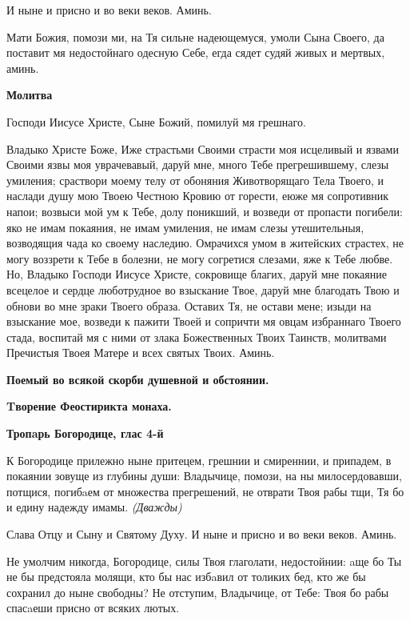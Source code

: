 И ныне и присно и во веки веков. Аминь.


Мати Божия, помози ми, на Тя сильне надеющемуся, умоли Сына Своего, да поставит мя недостойнаго одесную Себе, егда сядет судяй живых и мертвых, аминь.




\bfseries Молитва\normalfont{}


Господи Иисусе Христе, Сыне Божий, помилуй мя грешнаго.


Владыко Христе Боже, Иже страстьми Своими страсти моя исцеливый и язвами Своими язвы моя уврачевавый, даруй мне, много Тебе прегрешившему, слезы умиления; сраствори моему телу от обоняния Животворящаго Тела Твоего, и наслади душу мою Твоею Честною Кровию от горести, еюже мя сопротивник напои; возвыси мой ум к Тебе, долу поникший, и возведи от пропасти погибели: яко не имам покаяния, не имам умиления, не имам слезы утешительныя, возводящия чада ко своему наследию. Омрачихся умом в житейских страстех, не могу воззрети к Тебе в болезни, не могу согретися слезами, яже к Тебе любве. Но, Владыко Господи Иисусе Христе, сокровище благих, даруй мне покаяние всецелое и сердце люботрудное во взыскание Твое, даруй мне благодать Твою и обнови во мне зраки Твоего образа. Оставих Тя, не остави мене; изыди на взыскание мое, возведи к пажити Твоей и сопричти мя овцам избраннаго Твоего стада, воспитай мя с ними от злака Божественных Твоих Таинств, молитвами Пречистыя Твоея Матере и всех святых Твоих. Аминь.


\mychapterending





\bfseries Поемый во всякой скорби душевной и обстоянии.\normalfont{}


\bfseries Tворение Феостирикта монаха.\normalfont{}




\bfseries Тропaрь Богородице, глас 4-й\normalfont{}


К Богородице прилежно ныне притецем, грешнии и смиреннии, и припадем, в покаянии зовуще из глубины души: Владычице, помози, на ны милосердовавши, потщися, погибaем от множества прегрешений, не отврати Твоя рабы тщи, Тя бо и едину надежду имамы. \itshape (Дважды)\normalfont{}


Слава Отцу и Сыну и Святому Духу. И ныне и присно и во веки веков. Аминь.


Не умолчим никогда, Богородице, силы Твоя глаголати, недостойнии: aще бо Ты не бы предстояла молящи, кто бы нас избaвил от толиких бед, кто же бы сохранил до ныне свободны? Не отступим, Владычице, от Тебе: Твоя бо рабы спасaеши присно от всяких лютых.




